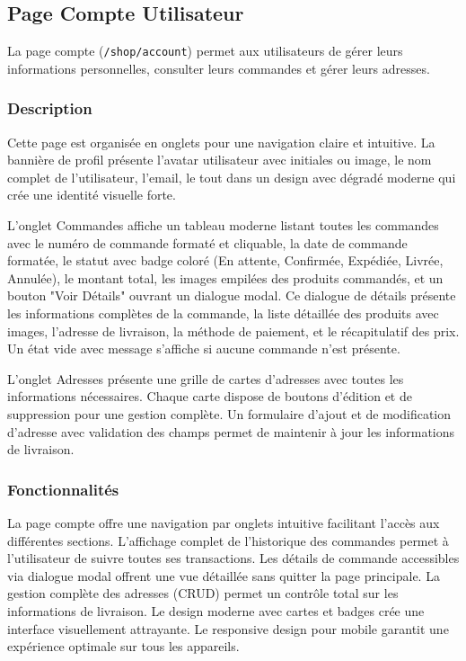 \documentclass[12pt,a4paper]{article}
\begin{document}
\subsection{Page Compte Utilisateur}

La page compte (\texttt{/shop/account}) permet aux utilisateurs de gérer leurs informations personnelles, consulter leurs commandes et gérer leurs adresses.

\subsubsection{Description}

Cette page est organisée en onglets pour une navigation claire et intuitive. La bannière de profil présente l'avatar utilisateur avec initiales ou image, le nom complet de l'utilisateur, l'email, le tout dans un design avec dégradé moderne qui crée une identité visuelle forte.

L'onglet Commandes affiche un tableau moderne listant toutes les commandes avec le numéro de commande formaté et cliquable, la date de commande formatée, le statut avec badge coloré (En attente, Confirmée, Expédiée, Livrée, Annulée), le montant total, les images empilées des produits commandés, et un bouton "Voir Détails" ouvrant un dialogue modal. Ce dialogue de détails présente les informations complètes de la commande, la liste détaillée des produits avec images, l'adresse de livraison, la méthode de paiement, et le récapitulatif des prix. Un état vide avec message s'affiche si aucune commande n'est présente.

L'onglet Adresses présente une grille de cartes d'adresses avec toutes les informations nécessaires. Chaque carte dispose de boutons d'édition et de suppression pour une gestion complète. Un formulaire d'ajout et de modification d'adresse avec validation des champs permet de maintenir à jour les informations de livraison.

\subsubsection{Fonctionnalités}

La page compte offre une navigation par onglets intuitive facilitant l'accès aux différentes sections. L'affichage complet de l'historique des commandes permet à l'utilisateur de suivre toutes ses transactions. Les détails de commande accessibles via dialogue modal offrent une vue détaillée sans quitter la page principale. La gestion complète des adresses (CRUD) permet un contrôle total sur les informations de livraison. Le design moderne avec cartes et badges crée une interface visuellement attrayante. Le responsive design pour mobile garantit une expérience optimale sur tous les appareils.
\end{document}
